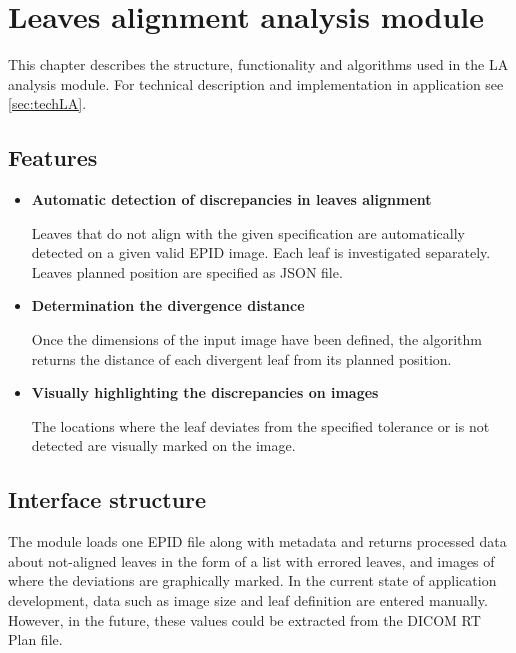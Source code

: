 \chapter{Leaves alignment analysis module} \label{chr:laModule}

This chapter describes the structure, functionality and algorithms used in the LA analysis module. For technical description and implementation in application see \autoref{sec:techLA}.

\section{Features}

\begin{itemize}

    \item \textbf{Automatic detection of discrepancies in leaves alignment}

    Leaves that do not align with the given specification are automatically detected on a given valid EPID image. Each leaf is investigated separately. Leaves planned position are specified as JSON file.
    
    \item \textbf{Determination the divergence distance}

    Once the dimensions of the input image have been defined, the algorithm returns the distance of each divergent leaf from its planned position.
    
    \item \textbf{Visually highlighting the discrepancies on images}

    The locations where the leaf deviates from the specified tolerance or is not detected are visually marked on the image.
    
\end{itemize}

\section{Interface structure}

The module loads one EPID file along with metadata and returns processed data about not-aligned leaves in the form of a list with errored leaves, and images of where the deviations are graphically marked. In the current state of application development, data such as image size and leaf definition are entered manually. However, in the future, these values could be extracted from the DICOM RT Plan file.

